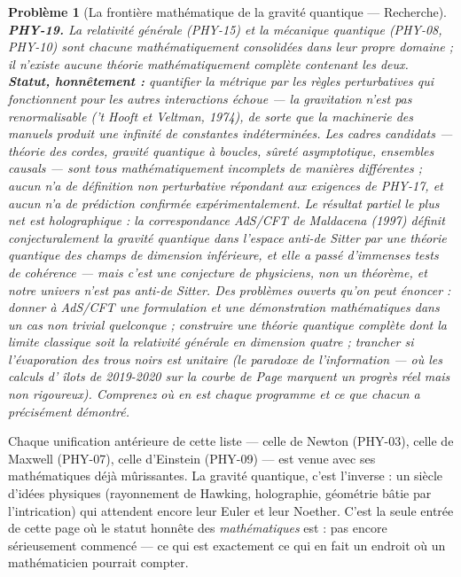 \documentclass[11pt]{article}
\newtheorem{problem}{Problème}
\begin{document}
\begin{problem}[{La frontière mathématique de la gravité quantique --- Recherche}]
\textbf{PHY-19.} La relativité générale (PHY-15) et la mécanique quantique
(PHY-08, PHY-10) sont chacune mathématiquement consolidées dans leur propre domaine ; il n'existe
aucune théorie mathématiquement complète contenant les deux. \textbf{Statut, honnêtement :}
quantifier la métrique par les règles perturbatives qui fonctionnent pour les autres interactions
échoue --- la gravitation n'est pas renormalisable ('t Hooft et Veltman, 1974), de sorte que la
machinerie des manuels produit une infinité de constantes indéterminées. Les cadres candidats ---
théorie des cordes, gravité quantique à boucles, sûreté asymptotique, ensembles causals --- sont
tous mathématiquement incomplets de manières différentes ; aucun n'a de définition non
perturbative répondant aux exigences de PHY-17, et aucun n'a de prédiction confirmée
expérimentalement. Le résultat partiel le plus net est holographique : la correspondance AdS/CFT
de Maldacena (1997) \textit{définit} conjecturalement la gravité quantique dans l'espace anti-de
Sitter par une théorie quantique des champs de dimension inférieure, et elle a passé d'immenses
tests de cohérence --- mais c'est une conjecture de physiciens, non un théorème, et notre univers
n'est pas anti-de Sitter. Des problèmes ouverts qu'on peut énoncer : donner à AdS/CFT une
formulation et une démonstration mathématiques dans un cas non trivial quelconque ; construire
\textit{une} théorie quantique complète dont la limite classique soit la relativité générale en
dimension quatre ; trancher si l'évaporation des trous noirs est unitaire (le paradoxe de
l'information --- où les calculs d'\og{} îlots \fg{} de 2019-2020 sur la courbe de Page marquent un progrès
réel mais non rigoureux). Comprenez où en est chaque programme et ce que chacun a précisément
démontré.
\end{problem}

\noindent Chaque unification antérieure de cette liste --- celle de Newton (PHY-03), celle
de Maxwell (PHY-07), celle d'Einstein (PHY-09) --- est venue avec ses mathématiques déjà mûrissantes.
La gravité quantique, c'est l'inverse : un siècle d'idées physiques (rayonnement de Hawking,
holographie, géométrie bâtie par l'intrication) qui attendent encore leur Euler et leur Noether.
C'est la seule entrée de cette page où le statut honnête des \textit{mathématiques} est : pas encore
sérieusement commencé --- ce qui est exactement ce qui en fait un endroit où un mathématicien
pourrait compter.
\end{document}

